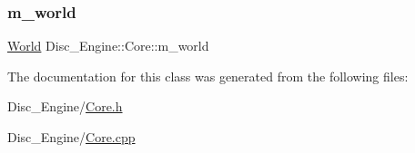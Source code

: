 \mbox{\label{class_disc___engine_1_1_core_a1674fa028162d9ff66fdab471bc97590}} 
\subsubsection{\texorpdfstring{m\+\_\+world}{m\_world}}
{\footnotesize\ttfamily \mbox{\hyperlink{class_world}{World}} Disc\+\_\+\+Engine\+::\+Core\+::m\+\_\+world\hspace{0.3cm}{\ttfamily [private]}}



The documentation for this class was generated from the following files\+:\begin{DoxyCompactItemize}
\item 
Disc\+\_\+\+Engine/\mbox{\hyperlink{_core_8h}{Core.\+h}}\item 
Disc\+\_\+\+Engine/\mbox{\hyperlink{_core_8cpp}{Core.\+cpp}}\end{DoxyCompactItemize}
